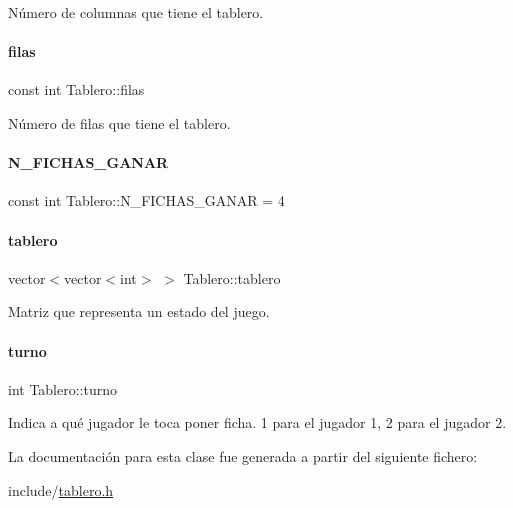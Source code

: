 Número de columnas que tiene el tablero. 

\hypertarget{classTablero_a6b1f04a8502106c33bf5469f791320e6}{}\label{classTablero_a6b1f04a8502106c33bf5469f791320e6} 
\paragraph{\texorpdfstring{filas}{filas}}
{\footnotesize\ttfamily const int Tablero\+::filas\hspace{0.3cm}{\ttfamily [private]}}



Número de filas que tiene el tablero. 

\hypertarget{classTablero_aa38ed353bef45bd6c5a2e3aa4a897720}{}\label{classTablero_aa38ed353bef45bd6c5a2e3aa4a897720} 
\paragraph{\texorpdfstring{N\+\_\+\+F\+I\+C\+H\+A\+S\+\_\+\+G\+A\+N\+AR}{N\_FICHAS\_GANAR}}
{\footnotesize\ttfamily const int Tablero\+::\+N\+\_\+\+F\+I\+C\+H\+A\+S\+\_\+\+G\+A\+N\+AR = 4\hspace{0.3cm}{\ttfamily [static]}}

\hypertarget{classTablero_a5df607d108c0c0a14aa4f393b7f43030}{}\label{classTablero_a5df607d108c0c0a14aa4f393b7f43030} 
\paragraph{\texorpdfstring{tablero}{tablero}}
{\footnotesize\ttfamily vector$<$vector$<$int$>$ $>$ Tablero\+::tablero\hspace{0.3cm}{\ttfamily [private]}}



Matriz que representa un estado del juego. 

\hypertarget{classTablero_ae460b4a3245da075dd381365abf158bc}{}\label{classTablero_ae460b4a3245da075dd381365abf158bc} 
\paragraph{\texorpdfstring{turno}{turno}}
{\footnotesize\ttfamily int Tablero\+::turno\hspace{0.3cm}{\ttfamily [private]}}



Indica a qué jugador le toca poner ficha. 1 para el jugador 1, 2 para el jugador 2. 



La documentación para esta clase fue generada a partir del siguiente fichero\+:\begin{DoxyCompactItemize}
\item 
include/\hyperlink{tablero_8h}{tablero.\+h}\end{DoxyCompactItemize}
